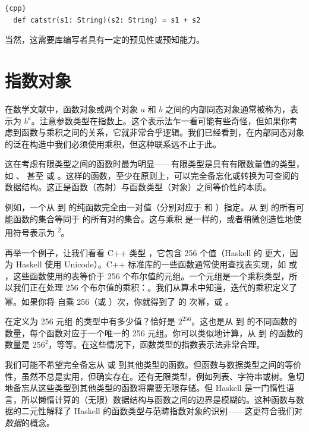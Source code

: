 \begin{lstlisting}{cpp}
  def catstr(s1: String)(s2: String) = s1 + s2
\end{lstlisting}
当然，这需要库编写者具有一定的预见性或预知能力。

\section{指数对象}

在数学文献中，函数对象或两个对象 $a$ 和 $b$ 之间的内部同态对象通常被称为，表示为 $b^{a}$。注意参数类型在指数上。这个表示法乍一看可能有些奇怪，但如果你考虑到函数与乘积之间的关系，它就非常合乎逻辑。我们已经看到，在内部同态对象的泛在构造中我们必须使用乘积，但这种联系远不止于此。

这在考虑有限类型之间的函数时最为明显——有限类型是具有有限数量值的类型，如 、 甚至  或 。这样的函数，至少在原则上，可以完全备忘化或转换为可查阅的数据结构。这正是函数（态射）与函数类型（对象）之间等价性的本质。

例如，一个从  到  的纯函数完全由一对值（分别对应于  和 ）指定。从  到  的所有可能函数的集合等同于  的所有对的集合。这与乘积  \times{}  是一样的，或者稍微创造性地使用符号表示为 \textsuperscript{2}。

再举一个例子，让我们看看 C++ 类型 ，它包含 256 个值（Haskell 的  更大，因为 Haskell 使用 Unicode）。C++ 标准库的一些函数通常使用查找表实现，如  或 ，这些函数使用的表等价于 256 个布尔值的元组。一个元组是一个乘积类型，所以我们正在处理 256 个布尔值的乘积：。我们从算术中知道，迭代的乘积定义了幂。如果你将  自乘 256（或 ）次，你就得到了  的  次幂，或 \textsuperscript{}。

在定义为 256 元组  的类型中有多少值？恰好是 $2^{256}$。这也是从  到  的不同函数的数量，每个函数对应于一个唯一的 256 元组。你可以类似地计算，从  到  的函数的数量是 $256^{2}$，等等。在这些情况下，函数类型的指数表示法非常合理。

我们可能不希望完全备忘从  或  到其他类型的函数。但函数与数据类型之间的等价性，虽然不总是实用，但确实存在。还有无限类型，例如列表、字符串或树。急切地备忘从这些类型到其他类型的函数将需要无限存储。但 Haskell 是一门惰性语言，所以懒惰计算的（无限）数据结构与函数之间的边界是模糊的。这种函数与数据的二元性解释了 Haskell 的函数类型与范畴指数对象的识别——这更符合我们对\emph{数据}的概念。

